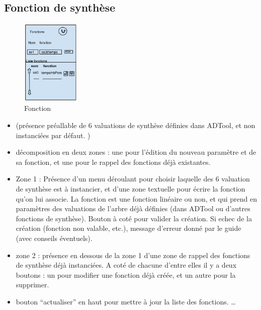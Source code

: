 	\subsection{Fonction de synthèse}
		\begin{figure}
			\begin{center}
				\includegraphics[width=0.25\textwidth]{figure/fonction.png}
			\end{center}
			\caption{Fonction}
			\label{fig:fonction}
		\end{figure}

		\begin{itemize}
			\item (présence préallable de 6 valuations de synthèse définies dans ADTool, et non instanciées par défaut. )
			\item décomposition en deux zones : une pour l'édition du nouveau paramètre et de sa fonction, et une pour le rappel des fonctions déjà existantes.
			\item Zone 1 : Présence d’un menu déroulant pour choisir laquelle des 6 valuation de synthèse est à instancier, et d'une zone textuelle pour écrire la fonction qu'on lui associe. La fonction est une fonction linéaire ou non, et qui prend en paramètres des valuations de l'arbre déjà définies (dans ADTool ou d'autres fonctions de synthèse). Bouton à coté pour valider la création. Si echec de la création (fonction non valable, etc.), message d'erreur donné par le guide (avec conseils éventuels).
			\item zone 2 : présence en dessous de la zone 1 d’une zone de rappel des fonctions de synthèse déjà instanciées. A coté de chacune d’entre elles il y a deux boutons : un pour modifier une fonction déjà créée, et un autre pour la supprimer.
			\item bouton “actualiser” en haut pour mettre à jour la liste des fonctions. \ldots
		\end{itemize}
		
		
		

